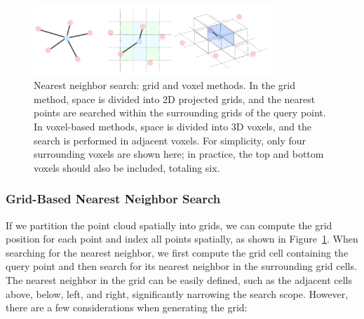 \begin{figure}[!htp]
	\centering
	\includegraphics[width=0.8\textwidth]{resources/basic-point-cloud/grid-and-voxel.pdf}
	\caption{Nearest neighbor search: grid and voxel methods. In the grid method, space is divided into 2D projected grids, and the nearest points are searched within the surrounding grids of the query point. In voxel-based methods, space is divided into 3D voxels, and the search is performed in adjacent voxels. For simplicity, only four surrounding voxels are shown here; in practice, the top and bottom voxels should also be included, totaling six.}
	\label{fig:grid-and-voxel}
\end{figure}

\subsubsection{Grid-Based Nearest Neighbor Search}
If we partition the point cloud spatially into grids, we can compute the grid position for each point and index all points spatially, as shown in Figure~\ref{fig:grid-and-voxel}. When searching for the nearest neighbor, we first compute the grid cell containing the query point and then search for its nearest neighbor in the surrounding grid cells. The nearest neighbor in the grid can be easily defined, such as the adjacent cells above, below, left, and right, significantly narrowing the search scope. However, there are a few considerations when generating the grid:

